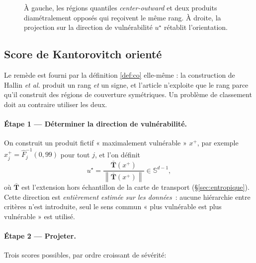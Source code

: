 \documentclass[11pt,a4paper]{article}
\theoremstyle{definition}
\theoremstyle{remark}
\newcommand{\Sphere}{\mathbb{S}}
\newcommand{\norm}[1]{\left\lVert #1 \right\rVert}
\newcommand{\scal}[2]{\left\langle #1 ,\, #2 \right\rangle}
\newcommand{\Tmap}{\mathbf{T}}
\begin{document}
\begin{figure}[htbp]
\caption{À gauche, les régions quantiles \emph{center-outward} et deux produits diamétralement
opposés qui reçoivent le même rang. À droite, la projection sur la direction de vulnérabilité
$u^\star$ rétablit l'orientation.}
\label{fig:orientation}
\end{figure}

\subsection{Score de Kantorovitch orienté}
\label{sec:otscore}

\medskip

Le remède est fourni par la définition \ref{def:co} elle-même : la construction de Hallin
\emph{et al.} produit un rang \emph{et} un signe, et l'article n'exploite que le rang parce qu'il
construit des régions de couverture symétriques. Un problème de classement doit au contraire
utiliser les deux.

\medskip

\paragraph{Étape 1 --- Déterminer la direction de vulnérabilité.} On construit un produit fictif
« maximalement vulnérable » $x^{+}$, par exemple $x^{+}_j = \hat F_j^{-1}(0{,}99)$ pour tout $j$,
et l'on définit
\[
u^\star = \frac{\bar{\Tmap}(x^{+})}{\norm{\bar{\Tmap}(x^{+})}} \in \Sphere^{d-1},
\]
où $\bar{\Tmap}$ est l'extension hors échantillon de la carte de transport (§\ref{sec:entropique}).
Cette direction est \emph{entièrement estimée sur les données}~: aucune hiérarchie entre critères
n'est introduite, seul le sens commun « plus vulnérable est plus vulnérable » est utilisé.

\medskip

\paragraph{Étape 2 --- Projeter.} Trois scores possibles, par ordre croissant de sévérité:
\end{document}
